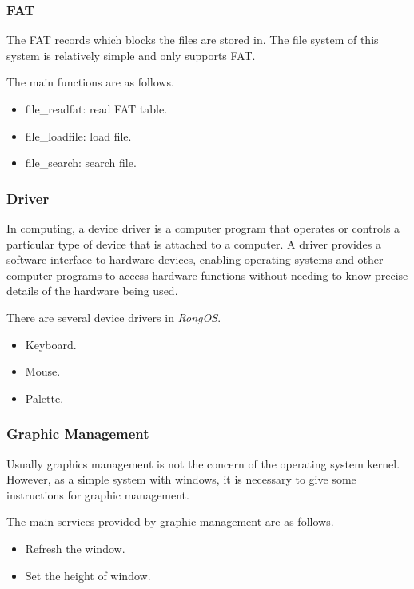 \documentclass{beamer}
\begin{document}
\begin{frame}
  \frametitle{FAT}
  The FAT records which blocks the files are stored in. The file system of this system is
  relatively simple and only supports FAT.

  The main functions are as follows.
  \begin{itemize}
  \item file\_readfat: read FAT table.
  \item file\_loadfile: load file.
  \item file\_search: search file.
  \end{itemize}
  
  
\end{frame}

\begin{frame}
  \frametitle{Driver}
  In computing, a device driver is a computer program that operates or controls a
  particular type of device that is attached to a computer. A driver provides a software
  interface to hardware devices, enabling operating systems and other computer programs to
  access hardware functions without needing to know precise details of the hardware being
  used.

  There are several device drivers in \emph{RongOS}.
  \begin{itemize}
  \item Keyboard.
  \item Mouse.
  \item Palette.
  \end{itemize}
\end{frame}
\begin{frame}
  \frametitle{Graphic Management}
  Usually graphics management is not the concern of the operating system kernel. However,
  as a simple system with windows, it is necessary to give some instructions for graphic
  management.

  The main services provided by graphic management are as follows.
  \begin{itemize}
  \item Refresh the window.
  \item Set the height of window.
  \end{itemize}
  
\end{frame}
\end{document}
